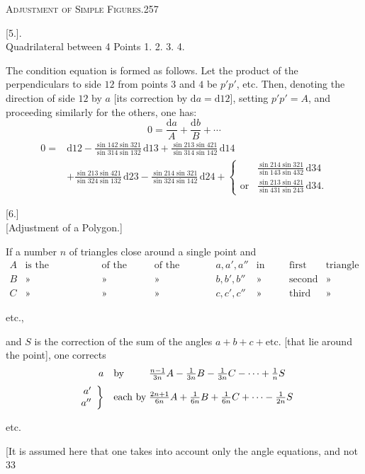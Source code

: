 \clearpage
\noindent\mbox{}\hfill\textsc{Adjustment of Simple Figures.}\hfill257\par\medskip
\begin{center}[5.]\hspace{.5em}.\\[5pt]Quadrilateral between 4 Points 1. 2. 3. 4.\end{center}
The condition equation is formed as follows. Let the product of the perpendiculars to side $12$ from points $3$ and $4$ be $p'p'$, etc. Then, denoting the direction of side $12$ by $a$ [its correction by $\mathrm da=\mathrm d12$], setting $p'p'=A$, and proceeding similarly for the others, one has:
\[
0=\frac{\mathrm da}A+\frac{\mathrm db}B+\cdots
\]
\noindent[or]
\[
\begin{aligned}
0={}&\mathrm d12-\tfrac{\sin142\sin321}{\sin314\sin132}\,\mathrm d13+\tfrac{\sin213\sin421}{\sin314\sin142}\,\mathrm d14\\
&+\tfrac{\sin213\sin421}{\sin324\sin132}\,\mathrm d23-\tfrac{\sin214\sin321}{\sin324\sin142}\,\mathrm d24
+\left\{\begin{array}{cl}
&\tfrac{\sin214\sin321}{\sin143\sin432}\,\mathrm d34\\[5pt]
\text{or}&\tfrac{\sin213\sin421}{\sin431\sin243}\,\mathrm d34.
\end{array}\right.
\end{aligned}
\]
\bigskip
\begin{center}[6.]\\[5pt][Adjustment of a Polygon.]\end{center}
If a number $n$ of triangles close around a single point and
\[
\begin{array}{rlllllll}
A&\text{is the correction}&\text{of the sum}&\text{of the angles}&a,a',a''&\text{in the}&\text{first}&\text{triangle}\\
B&\text{»}&\text{»}&\text{»}&b,b',b''&\text{»}&\text{second}&\text{»}\\
C&\text{»}&\text{»}&\text{»}&c,c',c''&\text{»}&\text{third}&\text{»}
\end{array}
\]
\begin{center}etc.,\end{center}
and $S$ is the correction of the sum of the angles $a+b+c+\text{etc.}$ [that lie around the point], one corrects
\[
\begin{array}{r@{\quad}l@{\;}l}
a&\text{by}&\tfrac{n-1}{3n}A-\tfrac1{3n}B-\tfrac1{3n}C-\cdots+\tfrac1nS\\[6pt]
\left.\begin{array}{r}a'\\a''\end{array}\right\}&\text{each by}&\tfrac{2n+1}{6n}A+\tfrac1{6n}B+\tfrac1{6n}C+\cdots-\tfrac1{2n}S
\end{array}
\]
\begin{center}etc.\end{center}
[It is assumed here that one takes into account only the angle equations, and not
\vfill{}\hfill33

